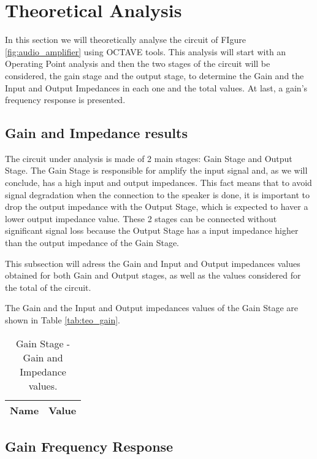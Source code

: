 \newpage
{}
\section{Theoretical Analysis}
\label{sec:analysis}

In this section we will theoretically analyse the circuit of FIgure \ref{fig:audio_amplifier} using OCTAVE tools. This analysis will start with an Operating Point analysis and then the two stages of the circuit will be considered, the gain stage and the output stage, to determine the Gain and the Input and Output Impedances in each one and the total values. At last, a gain's frequency response is presented. 


\subsection{Gain and Impedance results}

The circuit under analysis is made of 2 main stages: Gain Stage and Output Stage. The Gain Stage is responsible for amplify the input signal and, as we will conclude, has a high input and output impedances. This fact means that to avoid signal degradation when the connection to the speaker is done, it is important to drop the output impedance with the Output Stage, which is expected to haver a lower output impedance value. These 2 stages can be connected without significant signal loss because the Output Stage has a input impedance higher than the output impedance of the Gain Stage.

This subsection will adress the Gain and Input and Output impedances values obtained for both Gain and Output stages, as well as the values considered for the total of the circuit. 


The Gain and the Input and Output impedances values of the Gain Stage are shown in Table \ref{tab:teo_gain}.

\begin{table}[H]
	\centering
	\begin{tabular}{|l|r|}
		\hline    
		{\bf Name} & {\bf Value} \\ \hline
		
	\end{tabular}
	\caption{Gain Stage - Gain and Impedance values.}
	\label{tab:teoresults}
\end{table}



\subsection{Gain Frequency Response}

